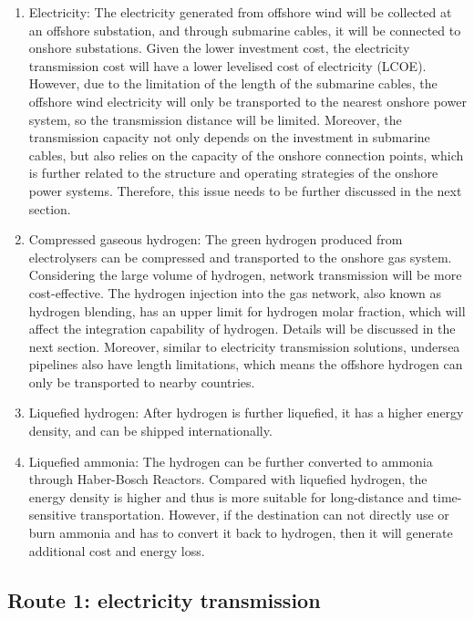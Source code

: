 \documentclass[sn-mathphys,Numbered]{sn-jnl}%
\theoremstyle{thmstyleone}%
\theoremstyle{thmstyletwo}%
\theoremstyle{thmstylethree}%
\begin{document}
\begin{enumerate}
    \item Electricity: The electricity generated from offshore wind will be collected at an offshore substation, and through submarine cables, it will be connected to onshore substations. Given the lower investment cost, the electricity transmission cost will have a lower levelised cost of electricity (LCOE). However, due to the limitation of the length of the submarine cables, the offshore wind electricity will only be transported to the nearest onshore power system, so the transmission distance will be limited. Moreover, the transmission capacity not only depends on the investment in submarine cables, but also relies on the capacity of the onshore connection points, which is further related to the structure and operating strategies of the onshore power systems. Therefore, this issue needs to be further discussed in the next section.
    \item Compressed gaseous hydrogen: The green hydrogen produced from electrolysers can be compressed and transported to the onshore gas system. Considering the large volume of hydrogen, network transmission will be more cost-effective. The hydrogen injection into the gas network, also known as hydrogen blending, has an upper limit for hydrogen molar fraction, which will affect the integration capability of hydrogen. Details will be discussed in the next section. Moreover, similar to electricity transmission solutions, undersea pipelines also have length limitations, which means the offshore hydrogen can only be transported to nearby countries. 
    \item Liquefied hydrogen: After hydrogen is further liquefied, it has a higher energy density, and can be shipped internationally.
    \item Liquefied ammonia: The hydrogen can be further converted to ammonia through Haber-Bosch Reactors. Compared with liquefied hydrogen, the energy density is higher and thus is more suitable for long-distance and time-sensitive transportation. However, if the destination can not directly use or burn ammonia and has to convert it back to hydrogen, then it will generate additional cost and energy loss.
\end{enumerate}

\subsection{Route 1: electricity transmission}
\end{document}
